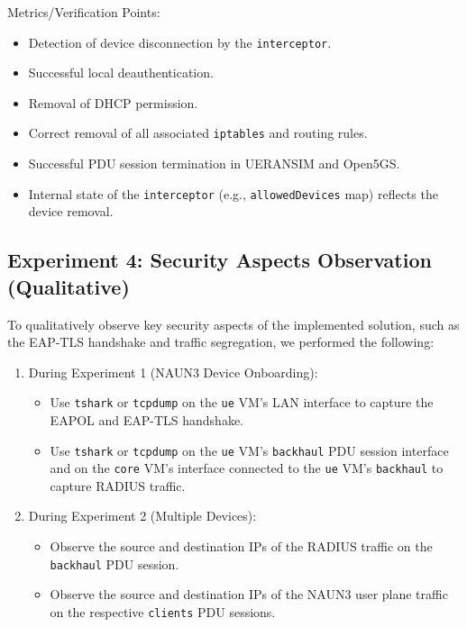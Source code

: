 Metrics/Verification Points:
\begin{itemize}
    \item Detection of device disconnection by the \texttt{interceptor}.
    \item Successful local deauthentication.
    \item Removal of \ac{DHCP} permission.
    \item Correct removal of all associated \texttt{iptables} and routing rules.
    \item Successful \ac{PDU} session termination in UERANSIM and Open5GS.
    \item Internal state of the \texttt{interceptor} (e.g., \texttt{allowedDevices} map) reflects the device removal.
\end{itemize}

\subsection{Experiment 4: Security Aspects Observation (Qualitative)}

To qualitatively observe key security aspects of the implemented solution, such as the \ac{EAP-TLS} handshake and traffic segregation, we performed the following:

\begin{enumerate}
    \item{
        During Experiment 1 (\ac{NAUN3} Device Onboarding):
        \begin{itemize}
            \item Use \texttt{tshark} or \texttt{tcpdump} on the \texttt{ue} \ac{VM}'s \ac{LAN} interface to capture the \ac{EAPOL} and \ac{EAP-TLS} handshake.

            \item Use \texttt{tshark} or \texttt{tcpdump} on the \texttt{ue} \ac{VM}'s \texttt{backhaul} \ac{PDU} session interface and on the \texttt{core} \ac{VM}'s interface connected to the \texttt{ue} \ac{VM}'s \texttt{backhaul} to capture \ac{RADIUS} traffic.
        \end{itemize}
    }
    \item{
        During Experiment 2 (Multiple Devices):
        \begin{itemize}
            \item Observe the source and destination \acp{IP} of the \ac{RADIUS} traffic on the \texttt{backhaul} \ac{PDU} session.
            
            \item Observe the source and destination \acp{IP} of the \ac{NAUN3} user plane traffic on the respective \texttt{clients} \ac{PDU} sessions.
        \end{itemize}
    }
\end{enumerate}

